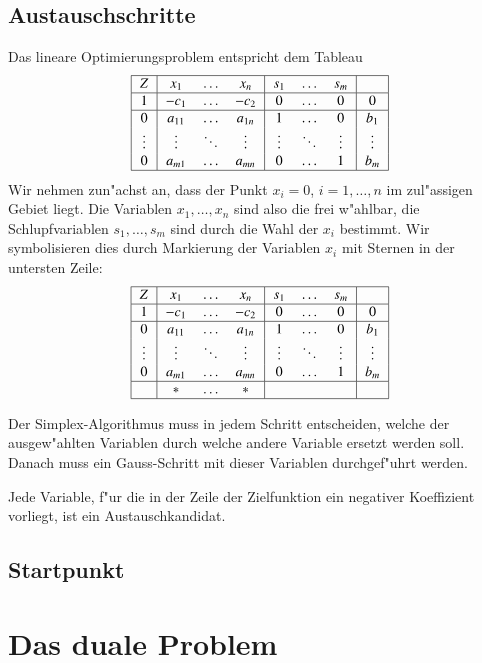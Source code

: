 \subsection{Austauschschritte}
Das lineare Optimierungsproblem entspricht dem Tableau
\begin{equation}
\begin{tabular}{|
>{$}c<{$}|
>{$}c<{$}
>{$}c<{$}
>{$}c<{$}|
>{$}c<{$}
>{$}c<{$}
>{$}c<{$}|
>{$}c<{$}|}
\hline
Z&x_1&\dots&x_n&s_1&\dots&s_m&\\
\hline
1&-c_1&\dots&-c_2&0&\dots&0&0\\
\hline
0&a_{11}&\dots&a_{1n}&1&\dots&0&b_1\\
\vdots&\vdots&\ddots&\vdots&\vdots&\ddots&\vdots&\vdots\\
0&a_{m1}&\dots&a_{mn}&0&\dots&1&b_m\\
\hline
\end{tabular}
\end{equation}
Wir nehmen zun"achst an, dass der Punkt $x_i=0$, $i=1,\dots,n$ 
im zul"assigen Gebiet liegt.
Die Variablen $x_1,\dots,x_n$ sind also die frei w"ahlbar, die
Schlupfvariablen $s_1,\dots,s_m$ sind durch die Wahl der
$x_i$ bestimmt.
Wir symbolisieren dies durch Markierung der Variablen $x_i$ mit
Sternen in der untersten Zeile:
\begin{equation}
\begin{tabular}{|
>{$}c<{$}|
>{$}c<{$}
>{$}c<{$}
>{$}c<{$}|
>{$}c<{$}
>{$}c<{$}
>{$}c<{$}|
>{$}c<{$}|}
\hline
Z&x_1&\dots&x_n&s_1&\dots&s_m&\\
\hline
1&-c_1&\dots&-c_2&0&\dots&0&0\\
\hline
0&a_{11}&\dots&a_{1n}&1&\dots&0&b_1\\
\vdots&\vdots&\ddots&\vdots&\vdots&\ddots&\vdots&\vdots\\
0&a_{m1}&\dots&a_{mn}&0&\dots&1&b_m\\
\hline
 &*&\dots&*& && & \\
\hline
\end{tabular}
\end{equation}

Der Simplex-Algorithmus muss in jedem Schritt entscheiden,
welche der ausgew"ahlten Variablen durch welche andere Variable
ersetzt werden soll.
Danach muss ein Gauss-Schritt mit dieser Variablen durchgef"uhrt werden.

Jede Variable, f"ur die in der Zeile der Zielfunktion ein negativer
Koeffizient vorliegt, ist ein Austauschkandidat. 

\subsection{Startpunkt}

\section{Das duale Problem}

